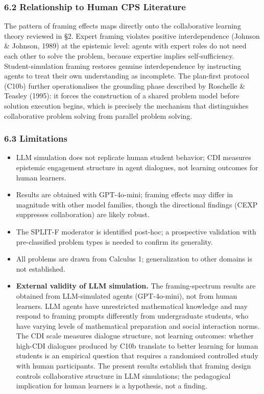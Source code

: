 \documentclass[
  11pt,
]{article}
\providecommand{\tightlist}{%
  \setlength{\itemsep}{0pt}\setlength{\parskip}{0pt}}
\begin{document}
\subsubsection{6.2 Relationship to Human CPS Literature}\label{relationship-human-cps}

The pattern of framing effects maps directly onto the collaborative
learning theory reviewed in \S2. Expert framing violates positive
interdependence (Johnson \& Johnson, 1989) at the epistemic level: agents
with expert roles do not need each other to solve the problem, because
expertise implies self-sufficiency. Student-simulation framing restores
genuine interdependence by instructing agents to treat their own
understanding as incomplete. The plan-first protocol (C10b) further
operationalises the grounding phase described by Roschelle \& Teasley
(1995): it forces the construction of a shared problem model before
solution execution begins, which is precisely the mechanism that
distinguishes collaborative problem solving from parallel problem solving.

\subsubsection{6.3 Limitations}\label{limitations}

\begin{itemize}
\tightlist
\item
  LLM simulation does not replicate human student behavior; CDI measures
  epistemic engagement structure in agent dialogues, not learning outcomes
  for human learners.
\item
  Results are obtained with GPT-4o-mini; framing effects may differ in
  magnitude with other model families, though the directional findings
  (CEXP suppresses collaboration) are likely robust.
\item
  The SPLIT-F moderator is identified post-hoc; a prospective validation
  with pre-classified problem types is needed to confirm its generality.
\item
  All problems are drawn from Calculus 1; generalization to other domains
  is not established.
\item \textbf{External validity of LLM simulation.} The framing-spectrum results are obtained from LLM-simulated agents (GPT-4o-mini), not from human learners. LLM agents have unrestricted mathematical knowledge and may respond to framing prompts differently from undergraduate students, who have varying levels of mathematical preparation and social interaction norms. The CDI scale measures dialogue structure, not learning outcomes: whether high-CDI dialogues produced by C10b translate to better learning for human students is an empirical question that requires a randomised controlled study with human participants. The present results establish that framing design controls collaborative structure in LLM simulations; the pedagogical implication for human learners is a hypothesis, not a finding.
\end{itemize}
\end{document}
